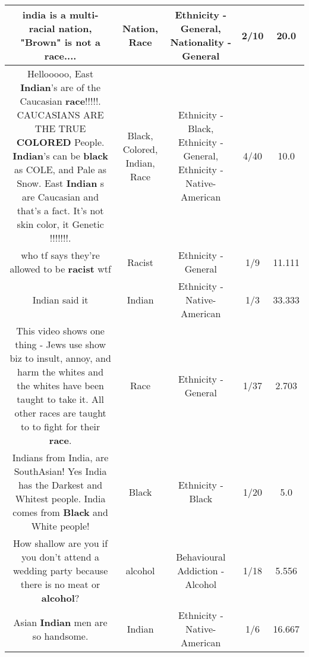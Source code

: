 \documentclass[11pt]{article}
\newlength\mylength
\begin{document}
\begin{center}
\begin{longtable}{|C{.65\mylength}|C{.30\mylength}|C{.12\mylength}|C{.12\mylength}|C{.12\mylength}|}
  \small india is a multi-racial \textbf{nation}, "Brown" is not a \textbf{race}....\normalsize   & Nation, Race & Ethnicity - General, Nationality - General & 2/10 & 20.0 \\  \hline
  \small Hellooooo, East \textbf{Indian}'s are of the Caucasian \textbf{race}!!!!!.  CAUCASIANS ARE THE TRUE \textbf{COLORED} People. \textbf{Indian}'s can be \textbf{black} as COLE, and Pale as Snow. East \textbf{Indian} s are Caucasian and that's a fact. It's not skin color, it Genetic  !!!!!!!.\normalsize   & Black, Colored, Indian, Race & Ethnicity - Black, Ethnicity - General, Ethnicity - Native-American & 4/40 & 10.0 \\  \hline
  \small who tf says they're allowed to be \textbf{racist} wtf\normalsize   & Racist & Ethnicity - General & 1/9 & 11.111 \\  \hline
  \small Indian said it\normalsize   & Indian & Ethnicity - Native-American & 1/3 & 33.333 \\  \hline
  \small This video shows one thing - Jews use show biz to insult, annoy, and harm the whites and the whites have been taught to take it. All other races are taught to to fight for their \textbf{race}.\normalsize   & Race & Ethnicity - General & 1/37 & 2.703 \\  \hline
  \small Indians from India, are SouthAsian! Yes India has the Darkest and Whitest people. India comes from \textbf{Black} and White people!\normalsize   & Black & Ethnicity - Black & 1/20 & 5.0 \\  \hline
  \small How shallow are you if you don't attend a wedding party because there is no meat or \textbf{alcohol}?\normalsize   & alcohol & Behavioural Addiction - Alcohol & 1/18 & 5.556 \\  \hline
  \small Asian \textbf{Indian} men are so handsome.\normalsize   & Indian & Ethnicity - Native-American & 1/6 & 16.667 \\  \hline

\end{longtable}
\end{center}
\end{document}
